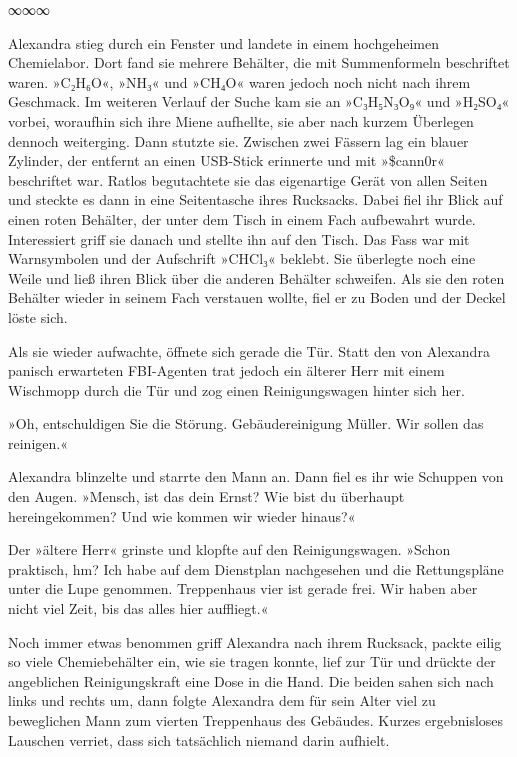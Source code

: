 \begin{center}
    ∞∞∞
\end{center}

Alexandra stieg durch ein Fenster und landete in einem hochgeheimen Chemielabor. Dort fand sie mehrere Behälter, die mit Summenformeln beschriftet waren. »C₂H₆O«, »NH₃« und »CH₄O« waren jedoch noch nicht nach ihrem Geschmack. Im weiteren Verlauf der Suche kam sie an »C₃H₅N₃O₉« und »H₂SO₄« vorbei, woraufhin sich ihre Miene aufhellte, sie aber nach kurzem Überlegen dennoch weiterging. Dann stutzte sie. Zwischen zwei Fässern lag ein blauer Zylinder, der entfernt an einen USB-Stick erinnerte und mit »\$cann0r« beschriftet war. Ratlos begutachtete sie das eigenartige Gerät von allen Seiten und steckte es dann in eine Seitentasche ihres Rucksacks. Dabei fiel ihr Blick auf einen roten Behälter, der unter dem Tisch in einem Fach aufbewahrt wurde. Interessiert griff sie danach und stellte ihn auf den Tisch. Das Fass war mit Warnsymbolen und der Aufschrift »CHCl₃« beklebt. Sie überlegte noch eine Weile und ließ ihren Blick über die anderen Behälter schweifen. Als sie den roten Behälter wieder in seinem Fach verstauen wollte, fiel er zu Boden und der Deckel löste sich.

Als sie wieder aufwachte, öffnete sich gerade die Tür. Statt den von Alexandra panisch erwarteten FBI-Agenten trat jedoch ein älterer Herr mit einem Wischmopp durch die Tür und zog einen Reinigungswagen hinter sich her.

»Oh, entschuldigen Sie die Störung. Gebäudereinigung Müller. Wir sollen das reinigen.«

Alexandra blinzelte und starrte den Mann an. Dann fiel es ihr wie Schuppen von den Augen. »Mensch, ist das dein Ernst? Wie bist du überhaupt hereingekommen? Und wie kommen wir wieder hinaus?«

Der »ältere Herr« grinste und klopfte auf den Reinigungswagen. »Schon praktisch, hm? Ich habe auf dem Dienstplan nachgesehen und die Rettungspläne unter die Lupe genommen. Treppenhaus vier ist gerade frei. Wir haben aber nicht viel Zeit, bis das alles hier auffliegt.«

Noch immer etwas benommen griff Alexandra nach ihrem Rucksack, packte eilig so viele Chemiebehälter ein, wie sie tragen konnte, lief zur Tür und drückte der angeblichen Reinigungskraft eine Dose in die Hand. Die beiden sahen sich nach links und rechts um, dann folgte Alexandra dem für sein Alter viel zu beweglichen Mann zum vierten Treppenhaus des Gebäudes. Kurzes ergebnisloses Lauschen verriet, dass sich tatsächlich niemand darin aufhielt.

